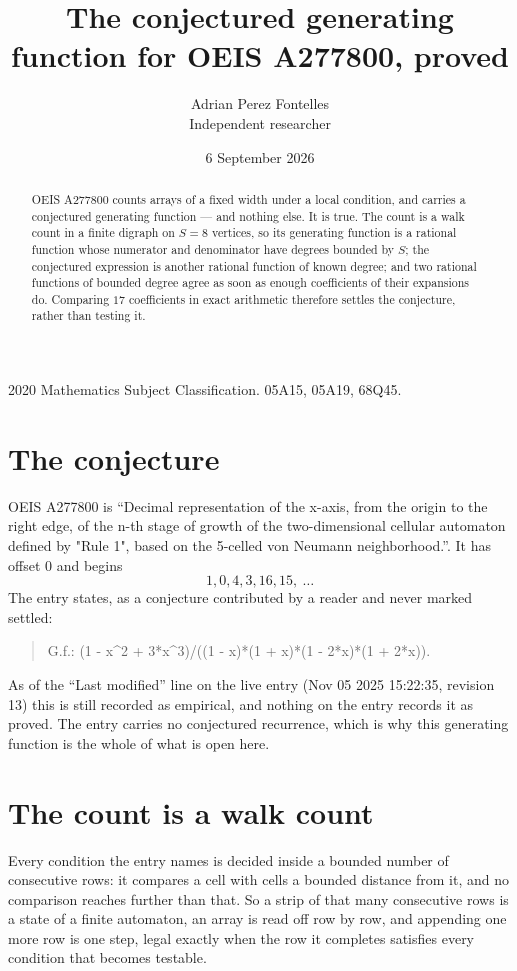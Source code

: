 \documentclass[11pt,a4paper]{article}
\title{The conjectured generating function for OEIS A277800, proved}
\author{Adrian Perez Fontelles\\ \small Independent researcher}
\date{6 September 2026}
\theoremstyle{plain}
\theoremstyle{definition}
\begin{document}
\maketitle

\begin{abstract}
OEIS A277800 counts arrays of a fixed width under a local condition, and carries a conjectured
generating function --- and nothing else. It is true. The count is a walk count in a finite
digraph on $S=8$ vertices, so its generating function is a rational function whose numerator
and denominator have degrees bounded by $S$; the conjectured expression is another rational
function of known degree; and two rational functions of bounded degree agree as soon as enough
coefficients of their expansions do. Comparing $17$ coefficients in exact arithmetic
therefore settles the conjecture, rather than testing it.
\end{abstract}

\noindent\small 2020 Mathematics Subject Classification. 05A15, 05A19, 68Q45.\normalsize

\section{The conjecture}

OEIS A277800 is ``Decimal representation of the x-axis, from the origin to the right edge, of the n-th stage of growth of the two-dimensional cellular automaton defined by "Rule 1", based on the 5-celled von Neumann neighborhood.''. It has offset $0$ and begins
\[
1, 0, 4, 3, 16, 15,\ \dots
\]
The entry states, as a conjecture contributed by a reader and never marked settled:
\begin{quote}
G.f.: (1 - x\^{}2 + 3*x\^{}3)/((1 - x)*(1 + x)*(1 - 2*x)*(1 + 2*x)).
\end{quote}
As of the ``Last modified'' line on the live entry (Nov 05 2025 15:22:35, revision 13) this is still
recorded as empirical, and nothing on the entry records it as proved. The entry carries no
conjectured recurrence, which is why this generating function is the whole of what is open
here.

\section{The count is a walk count}

Every condition the entry names is decided inside a bounded number of consecutive rows: it
compares a cell with cells a bounded distance from it, and no comparison reaches further than
that. So a strip of that many consecutive rows is a state of a finite automaton, an array is
read off row by row, and appending one more row is one step, legal exactly when the row it
completes satisfies every condition that becomes testable.
\end{document}
